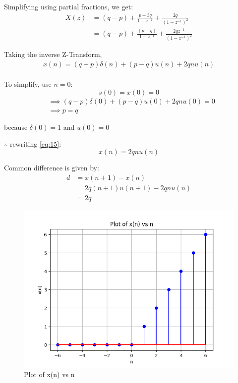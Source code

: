 \documentclass[journal,12pt,twocolumn]{IEEEtran}
\theoremstyle{remark}
\begin{document}
Simplifying using partial fractions, we get:
\begin{align}
    X(z) &= (q-p) + \frac{p-3q}{1-z^{-1}} + \frac{2q}{(1-z^{-1})^2}\\
    &= (q - p) + \frac{(p-q)}{1-z^{-1}} + \frac{2qz^{-1}}{(1-z^{-1})^2}
\end{align}

Taking the inverse Z-Transform,
\begin{align}
    x(n) = (q-p)\delta(n) + (p-q)u(n) + 2qnu(n)\label{eq:15}
\end{align}
\\
To simplify, use $n=0$:
\begin{equation}
    s(0) = x(0) = 0
\end{equation}
\begin{align}
    &\implies (q-p)\delta(0) + (p-q)u(0) + 2qnu(0) = 0\\
    &\implies p = q
\end{align}

because $\delta(0) = 1$ and $u(0) = 0$

$\therefore$ rewriting \eqref{eq:15}:
\begin{equation}
    x(n) = 2qnu(n)
\end{equation}

Common difference is given by:
\begin{align}
    d &= x(n+1) - x(n)\\
    &= 2q(n+1)u(n+1) - 2qnu(n)\\
    &= 2q
\end{align}

\begin{figure}[!h]
    \centering
    \includegraphics[width = \columnwidth]{figs/x_plot.png}
    \caption{Plot of x(n) vs n}
    \label{fig:1}
\end{figure}
\end{document}
